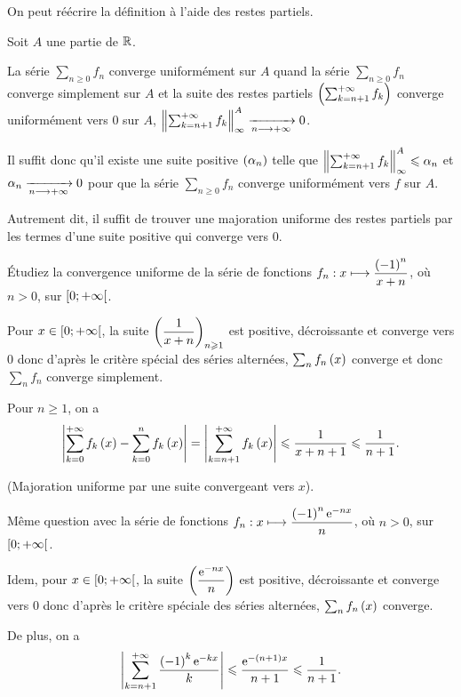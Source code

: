 On peut réécrire la définition à l'aide des restes partiels.

\begin{prop}
Soit \(A\) une partie de \(\mathbb{R}\).

La série \(\sum_{n\geq0}f_n\) converge uniformément sur \(A\) quand la série \(\sum_{n\geq0}f_n\) converge simplement sur \(A\) et la suite des restes partiels \(\left(\sum_{k=n+1}^{+\infty}f_k\right)\) converge uniformément vers \(0\) sur \(A\), \ie \(\norme{\sum_{k=n+1}^{\pinf}f_k}_\infty^A\tendqd{n\to\pinf}0\).
\end{prop}

Il suffit donc qu'il existe une suite positive \(\left(\alpha_n\right)\) telle que \(\norme{\sum_{k=n+1}^{\pinf}f_k}_\infty^A\leq\alpha_n\) et \(\alpha_n\xrightarrow[n\longrightarrow+\infty]{}0\) pour que la série \(\sum_{n\geq0}f_n\) converge uniformément vers \(f\) sur \(A\).

Autrement dit, il suffit de trouver une majoration uniforme des restes partiels par les termes d'une suite positive qui converge vers \(0\).

\begin{exo}
Étudiez la convergence uniforme de la série de fonctions \(f_n:x\longmapsto\dfrac{\left(-1\right)^n}{x+n}\), où \(n>0\), sur \(\left[0;+\infty\right[\).
\end{exo}

\begin{corr}
Pour \(x\in\left[0;+\infty\right[\), la suite \(\left(\dfrac{1}{x+n}\right)_{n\geqslant1}\) est positive, décroissante et converge vers \(0\) donc d'après le critère spécial des séries alternées, \(\sum_nf_n\left(x\right)\) converge et donc \(\sum_nf_n\) converge simplement.

Pour \(n\geq1\), on a \[\left\lvert\sum_{k=0}^{+\infty}f_k\left(x\right)-\sum_{k=0}^nf_k\left(x\right)\right\rvert=\left\lvert\sum_{k=n+1}^{+\infty}f_k\left(x\right)\right\rvert\leqslant\dfrac{1}{x+n+1}\leqslant\dfrac{1}{n+1}.\]

(Majoration uniforme par une suite convergeant vers \(x\)).
\end{corr}

\begin{exo}
Même question avec la série de fonctions \(f_n:x\longmapsto\dfrac{\left(-1\right)^n\mathrm{e}^{-nx}}{n}\), où \(n>0\), sur \(\left[0;+\infty\right[\).
\end{exo}

\begin{corr}
Idem, pour \(x\in\left[0;+\infty\right[\), la suite \(\left(\dfrac{\mathrm{e}^{-nx}}{n}\right)\) est positive, décroissante et converge vers \(0\) donc d'après le critère spéciale des séries alternées, \(\sum_nf_n\left(x\right)\) converge.

De plus, on a \[\left\lvert\sum_{k=n+1}^{+\infty}\dfrac{\left(-1\right)^k\mathrm{e}^{-kx}}{k}\right\rvert\leqslant\dfrac{\mathrm{e}^{-\left(n+1\right)x}}{n+1}\leqslant\dfrac{1}{n+1}.\]
\end{corr}

